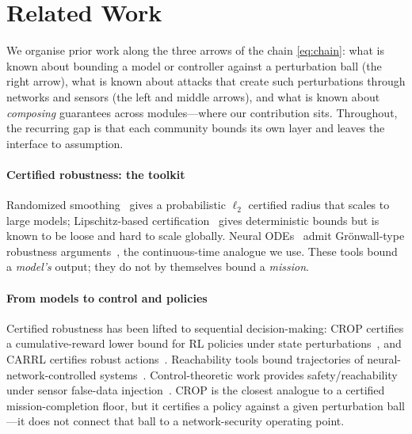 \documentclass[conference]{IEEEtran}
\begin{document}
\section{Related Work}
\label{sec:related}
We organise prior work along the three arrows of the chain \eqref{eq:chain}:
what is known about bounding a model or controller against a perturbation
ball (the right arrow), what is known about attacks that create such
perturbations through networks and sensors (the left and middle arrows), and
what is known about \emph{composing} guarantees across modules---where our
contribution sits. Throughout, the recurring gap is that each community bounds
its own layer and leaves the interface to assumption.

\paragraph{Certified robustness: the toolkit}
Randomized smoothing~\cite{cohen2019smoothing,salman2019provably} gives a
probabilistic $\ell_2$ certified radius that scales to large models;
Lipschitz-based certification~\cite{pauli2022training,zhang2022rethinking} gives
deterministic bounds but is known to be loose and hard to scale globally. Neural
ODEs~\cite{chen2018neuralode} admit Grönwall-type robustness
arguments~\cite{yan2020robustnode}, the continuous-time analogue we use. These
tools bound a \emph{model's} output; they do not by themselves bound a
\emph{mission}.

\paragraph{From models to control and policies}
Certified robustness has been lifted to sequential decision-making: CROP
certifies a cumulative-reward lower bound for RL policies under state
perturbations~\cite{wu2022crop}, and CARRL certifies robust
actions~\cite{everett2021carrl}. Reachability tools bound trajectories of
neural-network-controlled systems~\cite{ivanov2019verisig,tran2020nnv}.
Control-theoretic work provides safety/reachability under sensor false-data
injection~\cite{li2022lqg}. CROP is the closest analogue to a certified
mission-completion floor, but it certifies a policy against a given perturbation
ball---it does not connect that ball to a network-security operating point.
\end{document}
